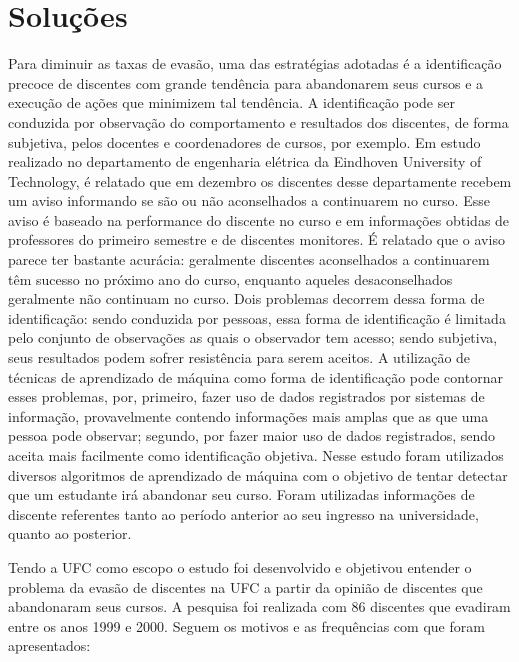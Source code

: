 \section{Soluções}

Para diminuir as taxas de evasão, uma das estratégias adotadas é a identificação precoce de discentes com grande tendência para abandonarem seus cursos e a execução de ações que minimizem tal tendência. A identificação pode ser conduzida por observação do comportamento e resultados dos discentes, de forma subjetiva, pelos docentes e coordenadores de cursos, por exemplo. Em estudo realizado no departamento de engenharia elétrica da Eindhoven University of Technology\cite{Predicting_Students}, é relatado que em dezembro os discentes desse departamente recebem um aviso informando se são ou não aconselhados a continuarem no curso. Esse aviso é baseado na performance do discente no curso e em informações obtidas de professores do primeiro semestre e de discentes monitores. É relatado que o aviso parece ter bastante acurácia: geralmente discentes aconselhados a continuarem têm sucesso no próximo ano do curso, enquanto aqueles desaconselhados geralmente não continuam no curso.
Dois problemas decorrem dessa forma de identificação: sendo conduzida por pessoas, essa forma de identificação é limitada pelo conjunto de observações as quais o observador tem acesso; sendo subjetiva, seus resultados podem sofrer resistência para serem aceitos. A utilização de técnicas de aprendizado de máquina como forma de identificação pode contornar esses problemas, por, primeiro, fazer uso de dados registrados por sistemas de informação, provavelmente contendo informações mais amplas que as que uma pessoa pode observar; segundo, por fazer maior uso de dados registrados, sendo aceita mais facilmente como identificação objetiva. Nesse estudo foram utilizados diversos algoritmos de aprendizado de máquina com o objetivo de tentar detectar que um estudante irá abandonar seu curso. Foram utilizadas informações de discente referentes tanto ao período anterior ao seu ingresso na universidade, quanto ao posterior.

Tendo a UFC como escopo o estudo \cite{andriola_2003} foi desenvolvido e objetivou entender o problema da evasão de discentes na UFC a partir da opinião de discentes que abandonaram seus cursos. A pesquisa foi realizada com 86 discentes que evadiram entre os anos 1999 e 2000. Seguem os motivos e as frequências com que foram apresentados: 

